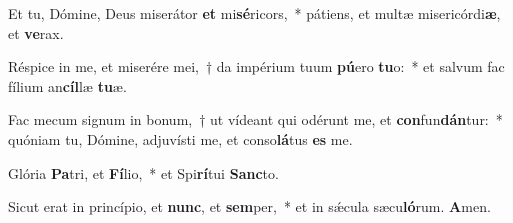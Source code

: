 \item Et tu, Dómine, Deus miserátor \textbf{et} mi\textbf{sé}ricors,~* pátiens, et multæ misericórdi\textbf{æ}, et \textbf{ve}rax.

\item Réspice in me, et miserére mei,~† da impérium tuum \textbf{pú}ero \textbf{tu}o:~* et salvum fac fílium an\textbf{cíl}læ \textbf{tu}æ.

\item Fac mecum signum in bonum,~† ut vídeant qui odérunt me, et \textbf{con}fun\textbf{dán}tur:~* quóniam tu, Dómine, adjuvísti me, et conso\textbf{lá}tus \textbf{es} me.

\item Glória \textbf{Pa}tri, et \textbf{Fí}lio,~* et Spi\textbf{rí}tui \textbf{Sanc}to.

\item Sicut erat in princípio, et \textbf{nunc}, et \textbf{sem}per,~* et in sǽcula sæcu\textbf{ló}rum. \textbf{A}men.